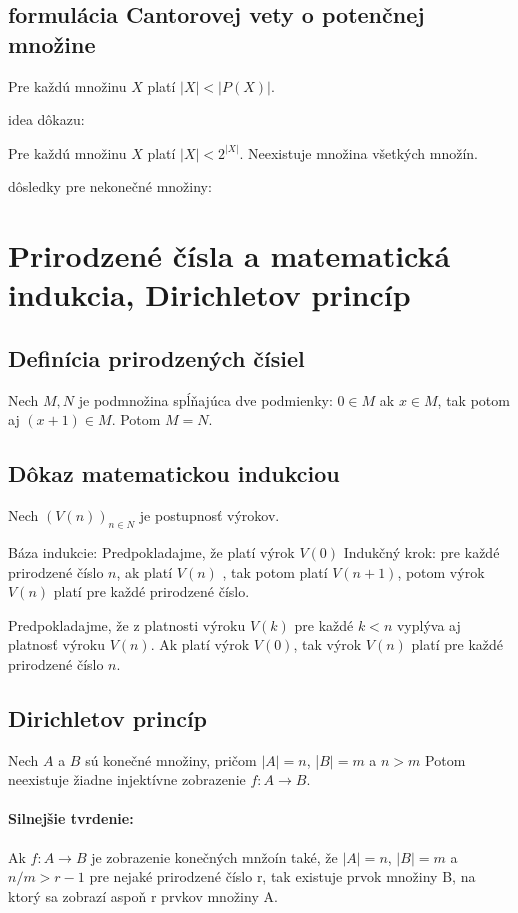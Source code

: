 	\subsection*{formulácia Cantorovej vety o potenčnej množine}
	Pre každú množinu $X$ platí $|X| < |P (X)|$.
	
	idea dôkazu:






	Pre každú množinu $X$ platí $|X| < 2^{|X|}$.
	Neexistuje množina všetkých množín.


	dôsledky pre nekonečné množiny:






\section {Prirodzené čísla a matematická indukcia, Dirichletov princíp}

	\subsection*{Definícia prirodzených čísiel}
		Nech $M, N$ je podmnožina spĺňajúca dve podmienky:
		$0 \in M$
		ak $x \in M$, tak potom aj $(x + 1) \in M$.
		Potom $M = N$.



	\subsection*{Dôkaz matematickou indukciou}
		Nech $(V(n))_{n \in N}$ je postupnosť výrokov. 

		Báza indukcie: Predpokladajme, že platí výrok $V(0)$
		Indukčný krok: pre každé prirodzené číslo $n$, ak platí $V(n)$ , tak potom platí $V(n + 1)$, potom výrok $V(n)$ platí pre každé prirodzené číslo.
		
		Predpokladajme, že z platnosti výroku $V(k)$ pre každé $k < n$ vyplýva aj platnosť výroku $V(n)$. Ak platí výrok $V(0)$, tak výrok $V(n)$ platí pre každé prirodzené číslo $n$.
	\subsection*{Dirichletov princíp}
		Nech $A$ a $B$ sú konečné množiny, pričom $|A| = n$, |$B| = m$ a $n > m$
		Potom neexistuje žiadne injektívne zobrazenie $f : A \rightarrow B$.

		\paragraph{Silnejšie tvrdenie: }
		Ak $f : A \rightarrow B$ je zobrazenie konečných mnžoín také, že $|A| = n$, $|B| = m$ a $n/m > r - 1$ pre nejaké prirodzené číslo r, tak existuje prvok množiny B, na ktorý sa zobrazí aspoň r prvkov množiny A.

